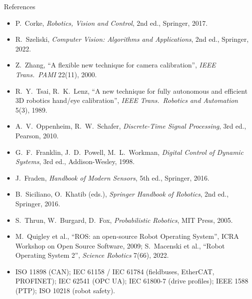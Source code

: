 \documentclass[aspectratio=169,10pt]{beamer}
\begin{document}
\begin{frame}{References}
\scriptsize
\begin{itemize}
\item P.~Corke, \emph{Robotics, Vision and Control}, 2nd ed., Springer, 2017.
\item R.~Szeliski, \emph{Computer Vision: Algorithms and Applications}, 2nd ed., Springer, 2022.
\item Z.~Zhang, ``A flexible new technique for camera calibration'', \emph{IEEE Trans.\ PAMI} 22(11), 2000.
\item R.~Y.~Tsai, R.~K.~Lenz, ``A new technique for fully autonomous and efficient 3D robotics hand/eye calibration'', \emph{IEEE Trans.\ Robotics and Automation} 5(3), 1989.
\item A.~V.~Oppenheim, R.~W.~Schafer, \emph{Discrete-Time Signal Processing}, 3rd ed., Pearson, 2010.
\item G.~F.~Franklin, J.~D.~Powell, M.~L.~Workman, \emph{Digital Control of Dynamic Systems}, 3rd ed., Addison-Wesley, 1998.
\item J.~Fraden, \emph{Handbook of Modern Sensors}, 5th ed., Springer, 2016.
\item B.~Siciliano, O.~Khatib (eds.), \emph{Springer Handbook of Robotics}, 2nd ed., Springer, 2016.
\item S.~Thrun, W.~Burgard, D.~Fox, \emph{Probabilistic Robotics}, MIT Press, 2005.
\item M.~Quigley et al., ``ROS: an open-source Robot Operating System'', ICRA Workshop on Open Source Software, 2009; S.~Macenski et al., ``Robot Operating System 2'', \emph{Science Robotics} 7(66), 2022.
\item ISO 11898 (CAN); IEC 61158 / IEC 61784 (fieldbuses, EtherCAT, PROFINET); IEC 62541 (OPC UA); IEC 61800-7 (drive profiles); IEEE 1588 (PTP); ISO 10218 (robot safety).
\end{itemize}
\end{frame}
\end{document}
